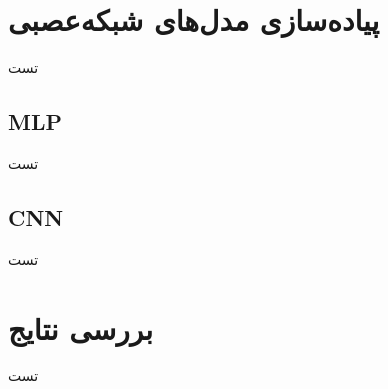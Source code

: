 \section{پیاده‌سازی مدل‌های شبکه‌عصبی}
تست

\subsection{MLP}
تست

\subsection{CNN}
تست



\section{بررسی نتایج}
تست



